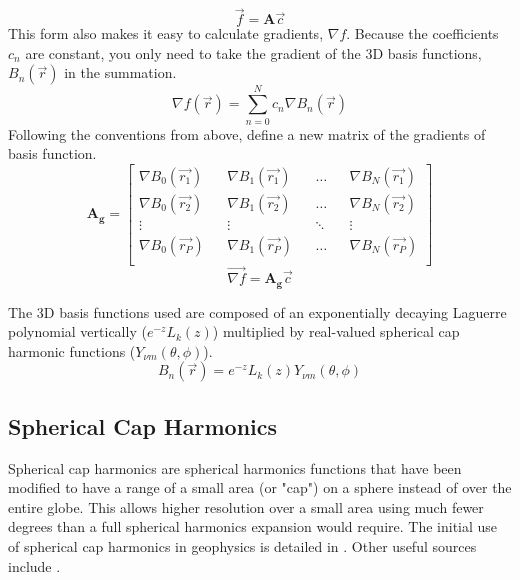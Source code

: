 \documentclass[12pt,letterpaper]{article}
\newcommand{\mat}[1]{\mathbf{#1}}
\begin{document}
  \begin{equation}
    \vec{f} = \mat{A}\vec{c}
  \end{equation}
  This form also makes it easy to calculate gradients, \(\nabla f\).  Because the coefficients \(c_n\) are constant, you only need to take the gradient of the 3D basis functions, \(B_n(\vec{r})\) in the summation.
  \[\nabla f(\vec{r}) = \sum_{n=0}^N c_n \nabla B_n(\vec{r})\]
  Following the conventions from above, define a new matrix of the gradients of basis function.
  \[\mat{A_g} = \begin{bmatrix}
                \nabla B_0(\vec{r_1}) && \nabla B_1(\vec{r_1}) && \hdots && \nabla B_N(\vec{r_1}) \\
                \nabla B_0(\vec{r_2}) && \nabla B_1(\vec{r_2}) && \hdots && \nabla B_N(\vec{r_2}) \\
                \vdots && \vdots && \ddots && \vdots \\
                \nabla B_0(\vec{r_P}) && \nabla B_1(\vec{r_P}) && \hdots && \nabla B_N(\vec{r_P}) \\
              \end{bmatrix}\]
  \[\vec{\nabla f} = \mat{A_g}\vec{c}\]


  The 3D basis functions used are composed of an exponentially decaying Laguerre polynomial vertically (\(e^{-z}L_k(z)\)) multiplied by real-valued spherical cap harmonic functions (\(Y_{\nu m}(\theta,\phi)\)).
  \begin{equation}
    B_n(\vec{r}) = e^{-z}L_k(z)Y_{\nu m}(\theta,\phi)
  \end{equation}

  \subsection{Spherical Cap Harmonics}
  Spherical cap harmonics are spherical harmonics functions that have been modified to have a range of a small area (or "cap") on a sphere instead of over the entire globe.  This allows higher resolution over a small area using much fewer degrees than a full spherical harmonics expansion would require.  The initial use of spherical cap harmonics in geophysics is detailed in \citet{Haines1985}.  Other useful sources include \citet{DeSantis1991,Thebault2006}.
\end{document}
